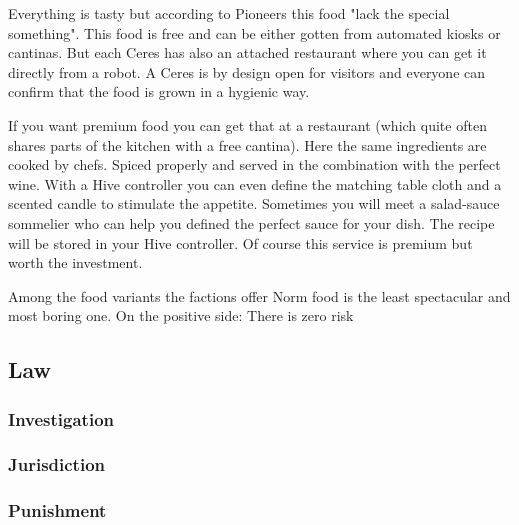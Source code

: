 Everything is tasty but according to Pioneers this food "lack the special something".
This food is free and can be either gotten from automated kiosks or cantinas. But each Ceres has also an attached restaurant where you can get it directly from a robot. A Ceres is by design open for visitors and everyone can confirm that the food is grown in a hygienic way.

If you want premium food you can get that at a restaurant (which quite often shares parts of the kitchen with a free cantina). Here the same ingredients are cooked by chefs. Spiced properly and served in the combination with the perfect wine. With a Hive controller you can even define the matching table cloth and a scented candle to stimulate the appetite.
Sometimes you will meet a salad-sauce sommelier who can help you defined the perfect sauce for your dish. The recipe will be stored in your Hive controller. Of course this service is premium but worth the investment.

Among the food variants the factions offer Norm food is the least spectacular and most boring one. On the positive side: There is zero risk

\subsection{Law}
\label{sec: norm law}

\subsubsection{Investigation}


\subsubsection{Jurisdiction}


\subsubsection{Punishment}





